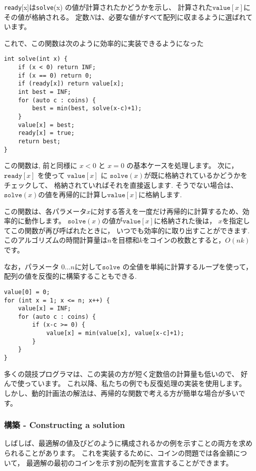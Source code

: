 \texttt{ready}[x]$は $\texttt{solve}(x) の値が計算されたかどうかを示し、
計算された$\texttt{value}[x]$にその値が格納される。
定数$N$は、必要な値がすべて配列に収まるように選ばれています。

これで、この関数は次のように効率的に実装できるようになった

\begin{lstlisting}
int solve(int x) {
    if (x < 0) return INF;
    if (x == 0) return 0;
    if (ready[x]) return value[x];
    int best = INF;
    for (auto c : coins) {
        best = min(best, solve(x-c)+1);
    }
    value[x] = best;
    ready[x] = true;
    return best;
}
\end{lstlisting}

この関数は, 前と同様に $x < 0$ と $x = 0$ の基本ケースを処理します。
次に， $\texttt{ready}[x]$ を使って $\texttt{value}[x]$ に
$\texttt{solve}(x)$が既に格納されているかどうかをチェックして、
格納されていればそれを直接返します.
そうでない場合は、$\texttt{solve}(x)$の値を再帰的に計算し$\texttt{value}[x]$に格納します.

この関数は、各パラメータ$x$に対する答えを一度だけ再帰的に計算するため、効率的に動作します。
$\texttt{solve}(x)$の値が$\texttt{value}[x]$に格納された後は，
$x$を指定してこの関数が再び呼ばれたときに，
いつでも効率的に取り出すことができます.
このアルゴリズムの時間計算量は$n$を目標和$k$をコインの枚数とすると，$O(nk)$です。


なお，パラメータ $0 \ldots n$に対して$\texttt{solve}$ の全値を単純に計算するループを使って，
配列の値を反復的に構築することもできる.

\begin{lstlisting}
value[0] = 0;
for (int x = 1; x <= n; x++) {
    value[x] = INF;
    for (auto c : coins) {
        if (x-c >= 0) {
            value[x] = min(value[x], value[x-c]+1);
        }
    }
}
\end{lstlisting}

多くの競技プログラマは、この実装の方が短く定数倍の計算量も低いので、
好んで使っています。
これ以降、私たちの例でも反復処理の実装を使用します。
しかし、動的計画法の解法は、再帰的な関数で考える方が簡単な場合が多いです。

\subsubsection{構築 - Constructing a solution}

しばしば、最適解の値及びどのように構成されるかの例を示すことの両方を求められることがあります。
これを実装するために、コインの問題では各金額について，
最適解の最初のコインを示す別の配列を宣言することができます。

